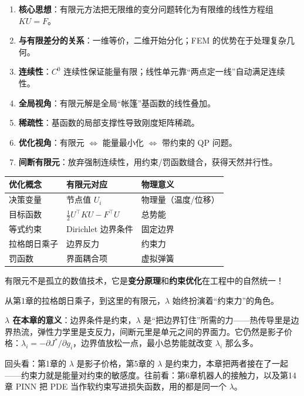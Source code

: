 \begin{enumerate}
    \item \textbf{核心思想}：有限元方法把无限维的变分问题转化为有限维的线性方程组 $KU = F$。
    
    \item \textbf{与有限差分的关系}：一维等价，二维开始分化；FEM 的优势在于处理复杂几何。
    
    \item \textbf{连续性}：$C^0$ 连续性保证能量有限；线性单元靠“两点定一线”自动满足连续性。
    
    \item \textbf{全局视角}：有限元解是全局“帐篷”基函数的线性叠加。
    
    \item \textbf{稀疏性}：基函数的局部支撑性导致刚度矩阵稀疏。
    
    \item \textbf{优化视角}：有限元 $\Leftrightarrow$ 能量最小化 $\Leftrightarrow$ 带约束的 QP 问题。
    
    \item \textbf{间断有限元}：放弃强制连续性，用约束/罚函数缝合，获得天然并行性。
\end{enumerate}

\begin{unification}[title=有限元：优化视角的大统一]
\begin{center}
\begin{tabular}{lll}
\toprule
\textbf{优化概念} & \textbf{有限元对应} & \textbf{物理意义} \\
\midrule
决策变量 & 节点值 $U_i$ & 物理量（温度/位移） \\
目标函数 & $\frac{1}{2}U^\top KU - F^\top U$ & 总势能 \\
等式约束 & Dirichlet 边界条件 & 固定边界 \\
拉格朗日乘子 & 边界反力 & 约束力 \\
罚函数 & 界面耦合项 & 虚拟弹簧 \\
\bottomrule
\end{tabular}
\end{center}

有限元不是孤立的数值技术，它是\textbf{变分原理}和\textbf{约束优化}在工程中的自然统一！

从第1章的拉格朗日乘子，到这里的有限元，$\lambda$ 始终扮演着“约束力”的角色。
\end{unification}

\begin{physicalmeaning}
\textbf{$\lambda$ 在本章的意义}：边界条件是约束，$\lambda$ 是“把边界钉住”所需的力——热传导里是边界热流，弹性力学里是支反力，间断元里是单元之间的界面力。它仍然是影子价格：$\lambda_i = -\partial J^*/\partial g_i$，边界值放松一点，最小总势能就改变 $\lambda_i$ 那么多。

回头看：第1章的 $\lambda$ 是影子价格，第5章的 $\lambda$ 是约束力，本章把两者接在了一起——约束力就是能量对约束的敏感度。往前看：第6章机器人的接触力，以及第14章 PINN 把 PDE 当作软约束写进损失函数，用的都是同一个 $\lambda$。
\end{physicalmeaning}


